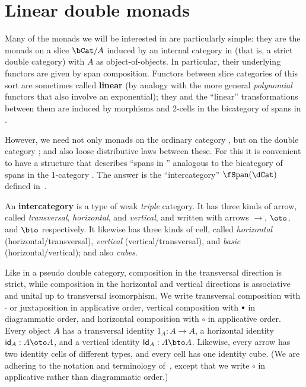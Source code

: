 \documentclass{amsart}
\let\tc\cdot
\newcommand{\bc}{\mathbin{\raisebox{1pt}{\scriptsize$\bullet$}}}
\let\oc\circ
\renewcommand{\id}{\mathsf{id}}
\newcommand{\Id}{\mathsf{Id}}
\begin{document}
\section{Linear double monads}
\label{sec:linear-double-monads}

Many of the monads we will be interested in are particularly simple: they are the monads on a slice $\bCat/A$ induced by an internal category in \bCat (that is, a strict double category) with $A$ as object-of-objects.
In particular, their underlying functors are given by span composition.
Functors between slice categories of this sort are sometimes called \textbf{linear} (by analogy with the more general \emph{polynomial} functors that also involve an exponential); they and the ``linear'' transformations between them are induced by morphisms and 2-cells in the bicategory of spans in \bCat.

However, we need not only monads on the ordinary category \bCat, but on the double category \dCat; and also loose distributive laws between these.
For this it is convenient to have a structure that describes ``spans in \dCat'' analogous to the bicategory of spans in the 1-category \bCat.
The answer is the ``intercategory'' $\fSpan(\dCat)$ defined in~\cite[6.5]{gp:intercategories-ii}.

An \textbf{intercategory} is a type of weak \emph{triple} category.
It has three kinds of arrow, called \emph{transversal}, \emph{horizontal}, and \emph{vertical}, and written with arrows $\to$, $\oto$, and $\bto$ respectively.
It likewise has three kinds of cell, called \emph{horizontal} (horizontal/transversal), \emph{vertical} (vertical/transversal), and \emph{basic} (horizontal/vertical); and also \emph{cubes}.

Like in a pseudo double category, composition in the transversal direction is strict, while composition in the horizontal and vertical directions is associative and unital up to transversal isomorphism.
We write transversal composition with $\tc$ or juxtaposition in applicative order, vertical composition with $\bc $ in diagrammatic order, and horizontal composition with $\oc$ in applicative order.
Every object $A$ has a transversal identity $1_A:A\to A$, a horizontal identity $\id_A:A\oto A$, and a vertical identity $\Id_A:A\bto A$.
Likewise, every arrow has two identity cells of different types, and every cell has one identity cube.
(We are adhering to the notation and terminology of~\cite{gp:intercategories}, except that we write $\oc$ in applicative rather than diagrammatic order.)
\end{document}
